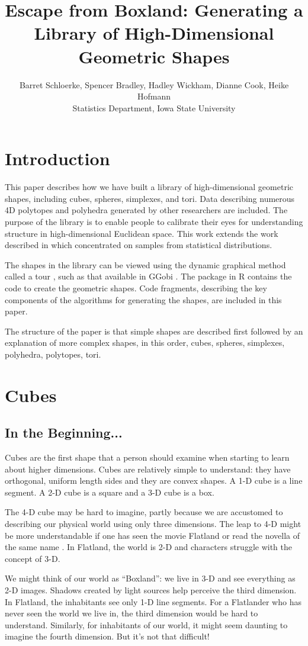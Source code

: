 \documentclass[article]{jss}
\title{
  Escape from Boxland: 
  Generating a Library of High-Dimensional Geometric Shapes
}
\author{
  Barret Schloerke, Spencer Bradley,  Hadley Wickham,
  Dianne Cook, Heike Hofmann\\ 
  Statistics Department, Iowa State University
}
\begin{document}
\section{Introduction}

This paper describes how we have built a library of high-dimensional
geometric shapes, including cubes, spheres, simplexes, and tori. Data
describing numerous 4D polytopes and polyhedra generated by other
researchers are included. The purpose of the library is to enable
people to calibrate their eyes for understanding structure in
high-dimensional Euclidean space. This work extends the work described
in \cite{Co97} which concentrated on samples from statistical
distributions.

The shapes in the library can be viewed using the dynamic graphical
method called a tour \citep{AS85}, such as that available in GGobi
\citep{STLBC02}.  The  package in R \citep{R03} contains
the code to create the geometric shapes. Code fragments, describing
the key components of the algorithms for generating the shapes, are
included in this paper.

The structure of the paper is that simple shapes are described first
followed by an explanation of more complex shapes, in this order,
cubes, spheres, simplexes, polyhedra, polytopes, tori.

\section{Cubes}

\subsection{In the Beginning...}

Cubes are the first shape that a person should examine when
starting to learn about higher dimensions. Cubes are relatively simple
to understand: they have orthogonal, uniform length sides and they are
convex shapes. A 1-D cube is a line segment. A 2-D cube is a square and
a 3-D cube is a box. 

The 4-D cube may be hard to imagine, partly because we are accustomed
to describing our physical world using only three dimensions.  The
leap to 4-D might be more understandable if one has seen the movie
Flatland \citep{Ma65} or read the novella of the same name
\citep{Ab1884}. In Flatland, the world is 2-D and characters struggle
with the concept of 3-D.  

We might think of our world as ``Boxland'': we live in 3-D and see
everything as 2-D images. Shadows created by light sources help
perceive the third dimension. In Flatland, the inhabitants see only
1-D line segments. For a Flatlander who has never seen the world we
live in, the third dimension would be hard to understand. Similarly,
for inhabitants of our world, it might seem daunting to imagine the
fourth dimension. But it's not that difficult!
\end{document}
